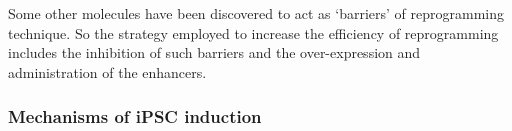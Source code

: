 


Some other molecules have been discovered to act as `barriers' of reprogramming technique. 
So the strategy employed to increase the efficiency of reprogramming includes the inhibition of such barriers and the over-expression and administration of the enhancers.




\subsubsection{Mechanisms of iPSC induction}


